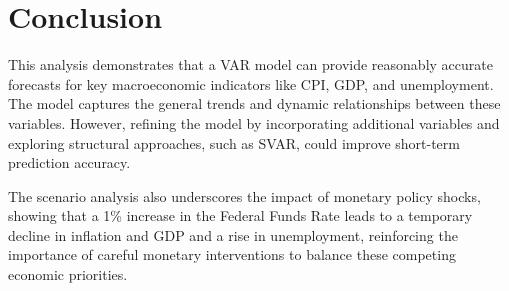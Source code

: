\documentclass{article}
\begin{document}
\section{Conclusion}
This analysis demonstrates that a VAR model can provide reasonably accurate forecasts for key macroeconomic indicators like CPI, GDP, and unemployment. The model captures the general trends and dynamic relationships between these variables. However, refining the model by incorporating additional variables and exploring structural approaches, such as SVAR, could improve short-term prediction accuracy.

The scenario analysis also underscores the impact of monetary policy shocks, showing that a 1\% increase in the Federal Funds Rate leads to a temporary decline in inflation and GDP and a rise in unemployment, reinforcing the importance of careful monetary interventions to balance these competing economic priorities.
\end{document}
